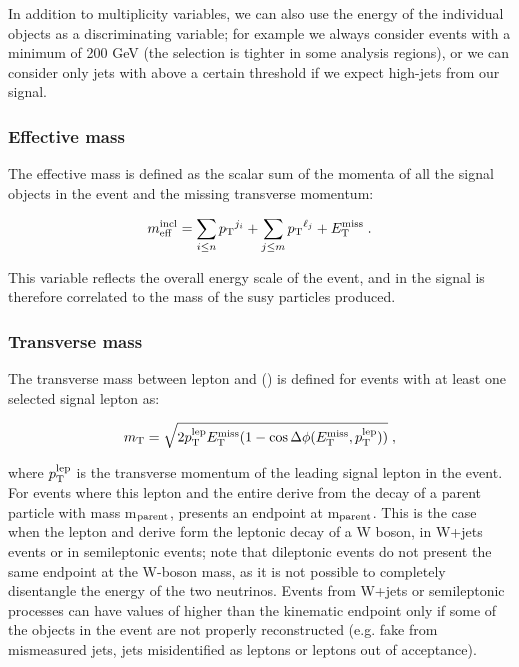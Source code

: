 \noindent In addition to multiplicity variables, we can also use the energy of the individual objects as a discriminating variable; 
for example we always consider events with a minimum \met of 200 GeV (the selection is tighter in some analysis regions), 
or we can consider only jets with \pt above a certain threshold if we expect high-\pt jets from our signal. 

\subsubsection*{Effective mass}

The effective mass is defined as the scalar sum of the momenta of all the signal objects in the event and the missing transverse momentum:

\begin{equation}
m_{\mathrm{eff}}^{\mathrm{incl}} = \sum_{i\leq n} {p_{\rm T}}^{j_i}  + \sum_{j\leq m} {p_{\rm T}}^{\ell_j}  + E_{\rm T}^{\mathrm{miss}} \; .
\end{equation}

\noindent This variable reflects the overall energy scale of the event, and in the signal is therefore correlated to the mass of the \gls{susy} particles produced. 

\subsubsection*{Transverse mass}

The transverse mass between lepton and \met (\mt) is defined for events with at least one selected signal lepton as: 

\begin{equation}
m_\mathrm{T} = \sqrt{2p_{\rm T}^{\rm{lep}}E_{\rm T}^{\mathrm{miss}}(1-\cos\Delta\phi(E_{\rm T}^{\mathrm{miss}},p_{\rm T}^{\rm{lep}}))} \; ,
\end{equation}

\noindent where $p_{\rm T}^{\rm{lep}}$ is the transverse momentum of the leading signal lepton in the event. 
For events where this lepton and the entire \met derive from the decay of a parent particle with mass m$_{\rm{parent}}$, \mt presents an endpoint at m$_{\rm{parent}}$. 
This is the case when the lepton and \met derive form the leptonic decay of a W boson, in W+jets events or in semileptonic \ttbar events; 
note that dileptonic \ttbar events do not present the same endpoint at the W-boson mass, as it is not possible to completely disentangle the energy of the two neutrinos. Events from W+jets or semileptonic \ttbar processes can have values of \mt higher than the kinematic endpoint only if some of the objects in the event are not properly reconstructed (e.g. fake \met from mismeasured jets, jets misidentified as leptons or leptons out of acceptance).

